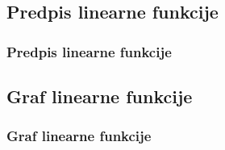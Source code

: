     \subsection{Predpis linearne funkcije}

        \begin{frame}
            \frametitle{Predpis linearne funkcije}
        \end{frame}


    \subsection{Graf linearne funkcije}

        \begin{frame}
            \frametitle{Graf linearne funkcije}
        \end{frame}

        